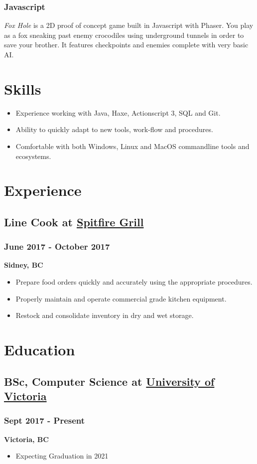 \documentclass[letterpaper]{article}
\begin{document}
\subsubsection{Javascript}
\label{sec:org83f69d5}
\emph{Fox Hole} is a 2D proof of concept game built in Javascript with Phaser. You play as a fox sneaking past enemy crocodiles using underground tunnels in order to save your brother. It features checkpoints and enemies complete with very basic AI.
\section{Skills}
\label{sec:org60ef724}
\begin{itemize}
\item Experience working with Java, Haxe, Actionscript 3, SQL and Git.
\item Ability to quickly adapt to new tools, work-flow and procedures.
\item Comfortable with both Windows, Linux and MacOS commandline tools and ecosystems.
\end{itemize}
\toggleurlstyle
\section{Experience}
\label{sec:org0a125b7}
\subsection{Line Cook at \href{https://spitfiregrill.ca}{Spitfire Grill}}
\label{sec:org9fb36a0}
\subsubsection{June 2017 - October 2017}
\label{sec:orgcdbe6e1}
\textbf{Sidney, BC}
\begin{itemize}
\item Prepare food orders quickly and accurately using the appropriate procedures.
\item Properly maintain and operate commercial grade kitchen equipment.
\item Restock and consolidate inventory in dry and wet storage.
\end{itemize}
\section{Education}
\label{sec:org3166eee}
\subsection{BSc, Computer Science at \href{https://uvic.ca}{University of Victoria}}
\label{sec:orgaedddb2}
\subsubsection{Sept 2017 - Present}
\label{sec:org77920d1}
\textbf{Victoria, BC}
\begin{itemize}
\item Expecting Graduation in 2021
\end{itemize}
\end{document}
